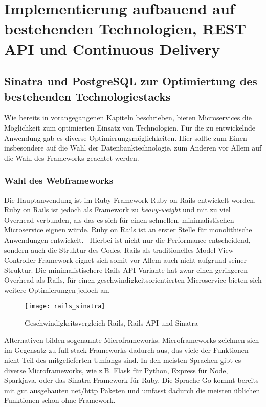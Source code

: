 \chapter{Implementierung aufbauend auf bestehenden Technologien, REST API und Continuous Delivery}

\section{Sinatra und PostgreSQL zur Optimiertung des bestehenden Technologiestacks}
Wie bereits in vorangegangenen Kapiteln beschrieben, bieten Microservices die Möglichkeit zum optimierten Einsatz von Technologien. Für die zu entwickelnde Anwendung gab es diverse Optimierungsmöglichkeiten. Hier sollte zum Einen insbesondere auf die Wahl der Datenbanktechnologie, zum Anderen vor Allem auf die Wahl des Frameworks geachtet werden.

\subsection{Wahl des Webframeworks}
Die Hauptanwendung ist im Ruby Framework Ruby on Rails\cite{rails} entwickelt worden. Ruby on Rails ist jedoch als Framework zu \textit{heavy-weight} und mit zu viel Overhead verbunden, als das es sich für einen schnellen, minimalistischen Microservice eignen würde. Ruby on Rails ist an erster Stelle für monolithische Anwendungen entwickelt.~\cite[][]{rails:doctrine}
Hierbei ist nicht nur die Performance entscheidend, sondern auch die Struktur des Codes. Rails als traditionelles Model-View-Controller Framework\cite[][]{wiki:mvc} eignet sich somit vor Allem auch nicht aufgrund seiner Struktur. Die minimalistischere Rails API Variante\cite{rails:api} hat zwar einen geringeren Overhead als Rails, für einen geschwindigkeitsorientierten Microservice bieten sich weitere Optimierungen jedoch an.

\begin{figure}[!ht]
    \centering
    \caption{Geschwindigkeitsvergleich Rails, Rails API und Sinatra \cite{newrelic:soa}}
    \label{fig:speed}
    \texttt{[image: rails\_sinatra]}
\end{figure}

Alternativen bilden sogenannte Microframeworks\cite{wiki:micro}. Microframeworks zeichnen sich im Gegensatz zu full-stack Frameworks dadurch aus, das viele der Funktionen nicht Teil des mitgelieferten Umfangs sind. In den meisten Sprachen gibt es diverse Microframeworks, wie z.B. Flask\cite{flask} für Python, Express\cite{expressjs} für Node, Sparkjava\cite{sparkjava}, oder das Sinatra Framework\cite{sinatra} für Ruby. Die Sprache Go\cite{golang} kommt bereits mit gut ausgebauten net/http Paketen und umfasst dadurch die meisten üblichen Funktionen schon ohne Framework.

